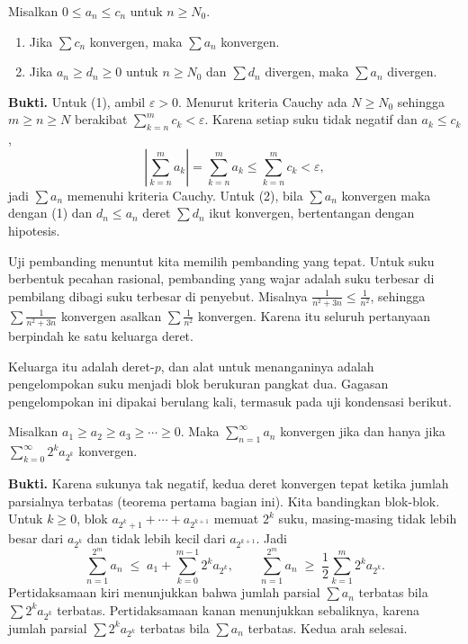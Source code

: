 \begin{teorema}
Misalkan $0 \le a_n \le c_n$ untuk $n \ge N_0$.
\begin{enumerate}
\item Jika $\sum c_n$ konvergen, maka $\sum a_n$ konvergen.
\item Jika $a_n \ge d_n \ge 0$ untuk $n \ge N_0$ dan $\sum d_n$ divergen, maka
      $\sum a_n$ divergen.
\end{enumerate}
\end{teorema}

\noindent\textbf{Bukti.} Untuk (1), ambil $\varepsilon>0$. Menurut kriteria Cauchy ada $N \ge N_0$ sehingga
$m \ge n \ge N$ berakibat $\sum_{k=n}^{m} c_k < \varepsilon$. Karena setiap suku tidak
negatif dan $a_k \le c_k$,
\[
  \left| \sum_{k=n}^{m} a_k \right| = \sum_{k=n}^{m} a_k \le \sum_{k=n}^{m} c_k
  < \varepsilon ,
\]
jadi $\sum a_n$ memenuhi kriteria Cauchy. Untuk (2), bila $\sum a_n$ konvergen maka
dengan (1) dan $d_n \le a_n$ deret $\sum d_n$ ikut konvergen, bertentangan dengan
hipotesis.

Uji pembanding menuntut kita memilih pembanding yang tepat. Untuk suku berbentuk
pecahan rasional, pembanding yang wajar adalah suku terbesar di pembilang dibagi suku
terbesar di penyebut. Misalnya $\frac{1}{n^2 + 3n} \le \frac{1}{n^2}$, sehingga
$\sum \frac{1}{n^2+3n}$ konvergen asalkan $\sum \frac{1}{n^2}$ konvergen. Karena itu
seluruh pertanyaan berpindah ke satu keluarga deret.

Keluarga itu adalah deret-$p$, dan alat untuk menanganinya adalah pengelompokan suku
menjadi blok berukuran pangkat dua. Gagasan pengelompokan ini dipakai berulang kali,
termasuk pada uji kondensasi berikut.

\begin{lemma}
Misalkan $a_1 \ge a_2 \ge a_3 \ge \cdots \ge 0$. Maka $\sum_{n=1}^{\infty} a_n$
konvergen jika dan hanya jika $\sum_{k=0}^{\infty} 2^k a_{2^k}$ konvergen.
\end{lemma}

\noindent\textbf{Bukti.} Karena sukunya tak negatif, kedua deret konvergen tepat ketika jumlah parsialnya
terbatas (teorema pertama bagian ini). Kita bandingkan blok-blok. Untuk $k \ge 0$,
blok $a_{2^k+1} + \cdots + a_{2^{k+1}}$ memuat $2^k$ suku, masing-masing tidak lebih
besar dari $a_{2^k}$ dan tidak lebih kecil dari $a_{2^{k+1}}$. Jadi
\[
  \sum_{n=1}^{2^m} a_n \;\le\; a_1 + \sum_{k=0}^{m-1} 2^k a_{2^k},
  \qquad
  \sum_{n=1}^{2^m} a_n \;\ge\; \frac{1}{2}\sum_{k=1}^{m} 2^k a_{2^k}.
\]
Pertidaksamaan kiri menunjukkan bahwa jumlah parsial $\sum a_n$ terbatas bila
$\sum 2^k a_{2^k}$ terbatas. Pertidaksamaan kanan menunjukkan sebaliknya, karena
jumlah parsial $\sum 2^k a_{2^k}$ terbatas bila $\sum a_n$ terbatas. Kedua arah
selesai.

